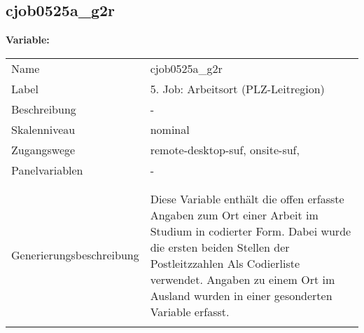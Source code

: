 	
	
	\subsection{cjob0525a\_g2r}
	\label{subSection:cjob0525a_g2r}

	\noindent\textbf{Variable:}\\
		\begin{tabular}{lL{11.3cm}}
			\label{tableVariable:cjob0525a_g2r}
			Name & cjob0525a\_g2r \\
			Label & 5. Job: Arbeitsort (PLZ-Leitregion) \\
			Beschreibung & - \\
			Skalenniveau & nominal \\
			Zugangswege &
				remote-desktop-suf,
				onsite-suf,
 \\
			Panelvariablen & -
			 \\
			 \\
 \\
					Generierungsbeschreibung & Diese Variable enthält die offen erfasste Angaben zum Ort einer Arbeit im Studium in codierter Form. Dabei wurde die ersten beiden Stellen der Postleitzzahlen Als Codierliste verwendet. Angaben zu einem Ort im Ausland wurden in einer gesonderten Variable erfasst.
				 \\	
			 \\
		\end{tabular}






